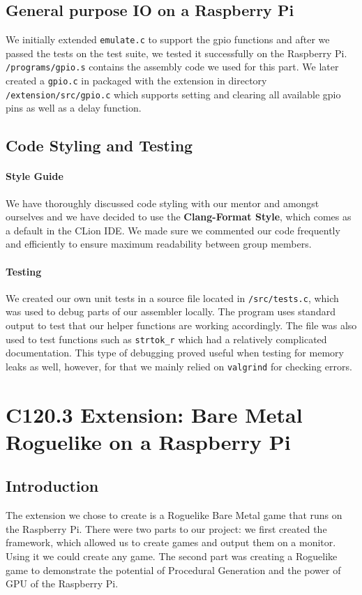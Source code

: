\documentclass[11pt]{article}
\begin{document}
\subsection{General purpose IO on a Raspberry Pi}
We initially extended \texttt{emulate.c} to support the gpio functions and after we passed the tests on the test suite, we tested it successfully on the Raspberry Pi. \texttt{/programs/gpio.s} contains the assembly code we used for this part. We later created a \texttt{gpio.c} in packaged with the extension in directory \texttt{/extension/src/gpio.c} which supports setting and clearing all available gpio pins as well as a delay function.

\subsection{Code Styling and Testing}
\paragraph{Style Guide} We have thoroughly discussed code styling with our mentor and amongst ourselves and we have decided to use the \textbf{Clang-Format Style}, which comes as a default in the CLion IDE. We made sure we commented our code frequently and efficiently to ensure maximum readability between group members.
\paragraph{Testing} We created our own unit tests in a source file located in \texttt{/src/tests.c}, which was used to debug parts of our assembler locally. The program uses standard output to test that our helper functions are working accordingly. The file was also used to test functions such as \texttt{strtok\_r} which had a relatively complicated documentation. This type of debugging proved useful when testing for memory leaks as well, however, for that we mainly relied on \texttt{valgrind} for checking errors.


\section{C120.3 Extension: Bare Metal Roguelike on a Raspberry Pi}
\subsection{Introduction}

The extension we chose to create is a Roguelike Bare Metal game that runs on the Raspberry Pi. There were two parts to our project: we first created the framework, which allowed us to create games and output them on a monitor. Using it we could create any game. The second part was creating a Roguelike game to demonstrate the potential of Procedural Generation and the power of GPU of the Raspberry Pi.
\end{document}
